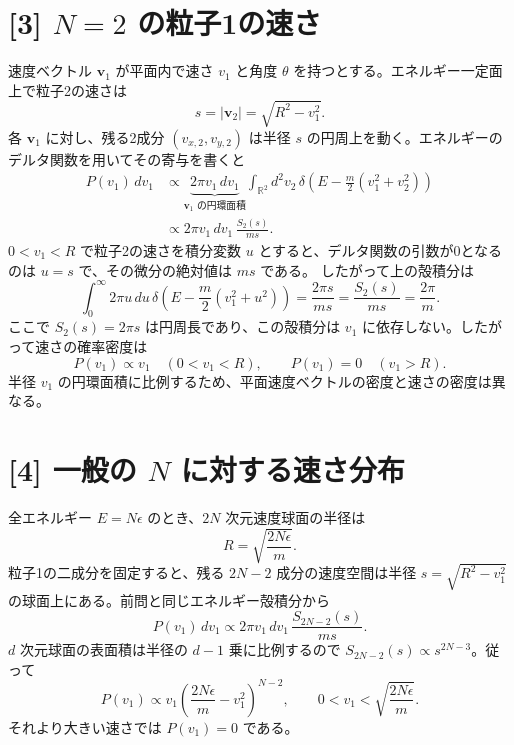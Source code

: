 \documentclass[11pt,a4paper]{article}
\begin{document}
\section*{[3] $N=2$ の粒子1の速さ}
速度ベクトル $\boldsymbol v_1$ が平面内で速さ $v_1$ と角度 $\theta$ を持つとする。エネルギー一定面上で粒子2の速さは
\begin{equation}
 s=|\boldsymbol v_2|=\sqrt{R^2-v_1^2}.
\end{equation}
各 $\boldsymbol v_1$ に対し、残る2成分 $(v_{x,2},v_{y,2})$ は半径 $s$ の円周上を動く。エネルギーのデルタ関数を用いてその寄与を書くと
\begin{align}
 P(v_1)\,dv_1
 &\propto \underbrace{2\pi v_1\,dv_1}_{\boldsymbol v_1\text{ の円環面積}}
 \int_{\mathbb R^2}d^2v_2\,
 \delta\!\left(E-\frac m2(v_1^2+v_2^2)\right)\\
 &\propto 2\pi v_1\,dv_1\,\frac{S_2(s)}{m s}.
\end{align}
$0<v_1<R$ で粒子2の速さを積分変数 $u$ とすると、デルタ関数の引数が0となるのは $u=s$ で、その微分の絶対値は $ms$ である。
したがって上の殻積分は
\begin{equation}
  \int_0^\infty 2\pi u\,du\,
  \delta\!\left(E-\frac m2(v_1^2+u^2)\right)
  =\frac{2\pi s}{ms}=\frac{S_2(s)}{ms}=\frac{2\pi}{m}.
\end{equation}
ここで $S_2(s)=2\pi s$ は円周長であり、この殻積分は $v_1$ に依存しない。したがって速さの確率密度は
\begin{equation}
 \boxed{P(v_1)\propto v_1\quad(0<v_1<R),\qquad
 P(v_1)=0\quad(v_1>R).}
\end{equation}
半径 $v_1$ の円環面積に比例するため、平面速度ベクトルの密度と速さの密度は異なる。

\section*{[4] 一般の $N$ に対する速さ分布}
全エネルギー $E=N\epsilon$ のとき、$2N$ 次元速度球面の半径は
\begin{equation}
 R=\sqrt{\frac{2N\epsilon}{m}}.
\end{equation}
粒子1の二成分を固定すると、残る $2N-2$ 成分の速度空間は半径
$s=\sqrt{R^2-v_1^2}$ の球面上にある。前問と同じエネルギー殻積分から
\begin{equation}
 P(v_1)\,dv_1\propto 2\pi v_1\,dv_1\,
 \frac{S_{2N-2}(s)}{m s}.
\end{equation}
$d$ 次元球面の表面積は半径の $d-1$ 乗に比例するので
$S_{2N-2}(s)\propto s^{2N-3}$。従って
\begin{equation}
 \boxed{P(v_1)\propto v_1
 \left(\frac{2N\epsilon}{m}-v_1^2\right)^{N-2},\qquad
 0<v_1<\sqrt{\frac{2N\epsilon}{m}}.}
\end{equation}
それより大きい速さでは $P(v_1)=0$ である。
\end{document}
